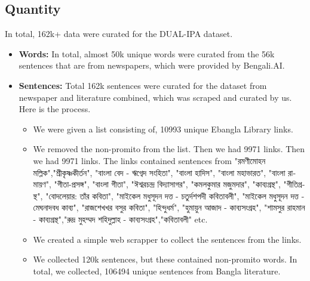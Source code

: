 \subsection{Quantity}
In total, 162k+ data were curated for the DUAL-IPA dataset.
\begin{itemize}
    \item \textbf{Words:} In total, almost 50k unique words were curated from the 56k sentences that are from newspapers, which were provided by Bengali.AI.
    \item \textbf{Sentences:} Total 162k sentences were curated for the dataset from newspaper and literature combined, which was scraped and curated by us. Here is the process.
    \begin{itemize}
        \item We were given a list consisting of, 10993 unique Ebangla Library links.
        \item We removed the non-promito from the list. Then we had 9971 links. Then we had 9971 links. The links contained sentences from \textbengali{"রমণীমোহন মল্লিক","শ্রীকৃষ্ণকীর্তন", "বাংলা বেদ - ঋগ্বেদ সংহিতা", "বাংলা হাদিস", "বাংলা মহাভারত",  "বাংলা রামায়ণ", "গীতা-প্রসঙ্গ", "বাংলা গীতা", "ঈশ্বরচন্দ্র বিদ্যাসাগর", "কমলকুমার মজুমদার", "কাব্যগ্রন্থ", "গীতিগ্রন্থ", "বোদলেয়ার: তাঁর কবিতা", "মাইকেল মধুসূদন দত্ত - চতুর্দশপদী কবিতাবলী", "মাইকেল মধুসূদন দত্ত - মেঘনাদবধ কাব্য", "রাজশেখখর বসুর কবিতা", "হিন্দুধর্ম", "হুমায়ুন আজাদ - কাব্যসংগ্রহ", "শামসুর রাহমান - কাব্যগ্রন্থ","রুদ্র মুহম্মদ শহিদুল্লাহ - কাব্যসংগ্রহ","কবিতাবলী"} etc.
        \item We created a simple web scrapper to collect the sentences from the links.
        \item We collected 120k sentences, but these contained non-promito words. In total, we collected, 106494 unique sentences from Bangla literature.
    \end{itemize}
\end{itemize}

